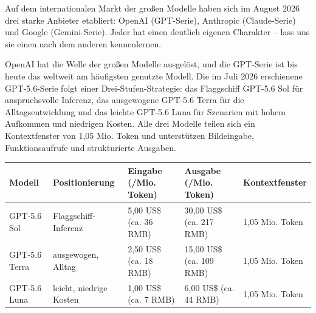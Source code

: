


Auf dem internationalen Markt der großen Modelle haben sich im August 2026 drei starke Anbieter etabliert: OpenAI (GPT-Serie), Anthropic (Claude-Serie) und Google (Gemini-Serie). Jeder hat einen deutlich eigenen Charakter – lass uns sie einen nach dem anderen kennenlernen.


OpenAI hat die Welle der großen Modelle ausgelöst, und die GPT-Serie ist bis heute das weltweit am häufigsten genutzte Modell. Die im Juli 2026 erschienene GPT-5.6-Serie folgt einer Drei-Stufen-Strategie: das Flaggschiff GPT-5.6 Sol für anspruchsvolle Inferenz, das ausgewogene GPT-5.6 Terra für die Alltagsentwicklung und das leichte GPT-5.6 Luna für Szenarien mit hohem Aufkommen und niedrigen Kosten. Alle drei Modelle teilen sich ein Kontextfenster von 1,05 Mio. Token und unterstützen Bildeingabe, Funktionsaufrufe und strukturierte Ausgaben.

\begin{center}
\begin{tabularx}{\linewidth}{|X|X|X|X|X|}
\hline
\textbf{Modell} & \textbf{Positionierung} & \textbf{Eingabe (/Mio. Token)} & \textbf{Ausgabe (/Mio. Token)} & \textbf{Kontextfenster} \tabularnewline
\hline
GPT-5.6 Sol & Flaggschiff-Inferenz & 5,00 US\$ (ca. 36 RMB) & 30,00 US\$ (ca. 217 RMB) & 1,05 Mio. Token \tabularnewline
GPT-5.6 Terra & ausgewogen, Alltag & 2,50 US\$ (ca. 18 RMB) & 15,00 US\$ (ca. 109 RMB) & 1,05 Mio. Token \tabularnewline
GPT-5.6 Luna & leicht, niedrige Kosten & 1,00 US\$ (ca. 7 RMB) & 6,00 US\$ (ca. 44 RMB) & 1,05 Mio. Token \tabularnewline
\hline
\end{tabularx}
\end{center}

